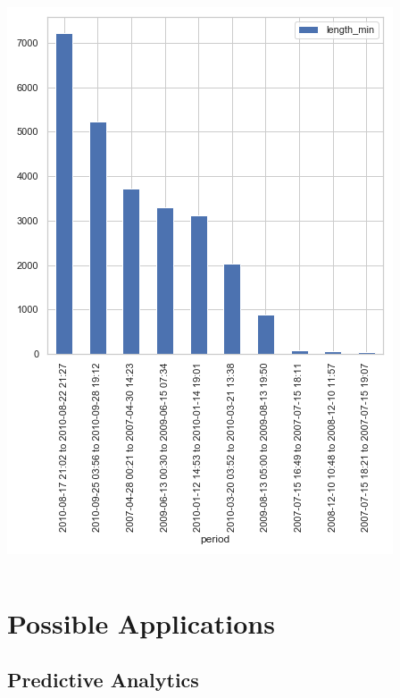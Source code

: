 \documentclass[10pt]{beamer}
\begin{document}
\begin{frame}
\begin{columns}[c]
\bigskip
{
    \centering
    \includegraphics[width=\textwidth,height=\textheight,keepaspectratio]{missing_periods.png}
    \par
}
\bigskip

\end{columns}


\end{frame}


\section{Possible Applications}

\subsection{Predictive Analytics}
\end{document}
